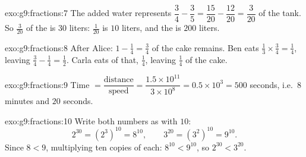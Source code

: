 \begin{solution}{exo:g9:fractions:7}
The added water represents
$\dfrac34 - \dfrac35 = \dfrac{15}{20} - \dfrac{12}{20} = \dfrac{3}{20}$
of the tank. So $\frac{3}{20}$ of the  is $30$ liters:
$\frac{1}{20}$ is $10$ liters, and the  is $200$ liters.
\end{solution}

\begin{solution}{exo:g9:fractions:8}
After Alice: $1 - \frac14 = \frac34$ of the cake remains. Ben eats
$\frac13 \times \frac34 = \frac14$, leaving
$\frac34 - \frac14 = \frac12$. Carla eats  of that, $\frac14$,
leaving $\frac14$ of the cake.
\end{solution}

\begin{solution}{exo:g9:fractions:9}
Time $= \dfrac{\text{distance}}{\text{speed}} =
\dfrac{1.5 \times 10^{11}}{3 \times 10^8} = 0.5 \times 10^3 = 500$
seconds, i.e.\ $8$ minutes and $20$ seconds.
\end{solution}

\begin{solution}{exo:g9:fractions:10}
Write both numbers as  with  $10$:
\[
2^{30} = \left(2^3\right)^{10} = 8^{10},
\qquad
3^{20} = \left(3^2\right)^{10} = 9^{10}.
\]
Since $8 < 9$, multiplying ten copies of each: $8^{10} < 9^{10}$, so
$2^{30} < 3^{20}$.
\end{solution}

